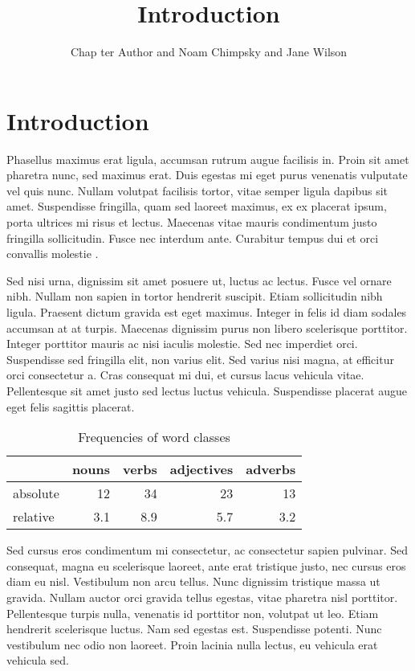 \documentclass[output=paper,colorlinks,citecolor=brown]{langscibook}
\title{Introduction}
\author{%
 Chap ter Author\affiliation{University of Eden} and
 Noam Chimpsky\affiliation{University of Pluto} and
 Jane Wilson\affiliation{National Institute for Language}
}
\begin{document}
\maketitle
\section{Introduction}
Phasellus maximus erat ligula, accumsan rutrum augue facilisis in. Proin sit amet pharetra nunc, sed maximus erat. Duis egestas mi eget purus venenatis vulputate vel quis nunc. Nullam volutpat facilisis tortor, vitae semper ligula dapibus sit amet. Suspendisse fringilla, quam sed laoreet maximus, ex ex placerat ipsum, porta ultrices mi risus et lectus. Maecenas vitae mauris condimentum justo fringilla sollicitudin. Fusce nec interdum ante. Curabitur tempus dui et orci convallis molestie \citep{Chomsky1957}.



Sed nisi urna, dignissim sit amet posuere ut, luctus ac lectus. Fusce vel ornare nibh. Nullam non sapien in tortor hendrerit suscipit. Etiam sollicitudin nibh ligula. Praesent dictum gravida est eget maximus. Integer in felis id diam sodales accumsan at at turpis. Maecenas dignissim purus non libero scelerisque porttitor. Integer porttitor mauris ac nisi iaculis molestie. Sed nec imperdiet orci. Suspendisse sed fringilla elit, non varius elit. Sed varius nisi magna, at efficitur orci consectetur a. Cras consequat mi dui, et cursus lacus vehicula vitae. Pellentesque sit amet justo sed lectus luctus vehicula. Suspendisse placerat augue eget felis sagittis placerat.


\begin{table}
\caption{Frequencies of word classes}
\label{tab:1:frequencies}
 \begin{tabular}{lrrrr}
            & nouns & verbs & adjectives & adverbs\\
  \midrule
  absolute  &   12 &    34  &    23     & 13\\
  relative  &   3.1 &   8.9 &    5.7    & 3.2\\
 \end{tabular}
\end{table}


Sed cursus eros condimentum mi consectetur, ac consectetur sapien pulvinar. Sed consequat, magna eu scelerisque laoreet, ante erat tristique justo, nec cursus eros diam eu nisl. Vestibulum non arcu tellus. Nunc dignissim tristique massa ut gravida. Nullam auctor orci gravida tellus egestas, vitae pharetra nisl porttitor. Pellentesque turpis nulla, venenatis id porttitor non, volutpat ut leo. Etiam hendrerit scelerisque luctus. Nam sed egestas est. Suspendisse potenti. Nunc vestibulum nec odio non laoreet. Proin lacinia nulla lectus, eu vehicula erat vehicula sed.
\end{document}
